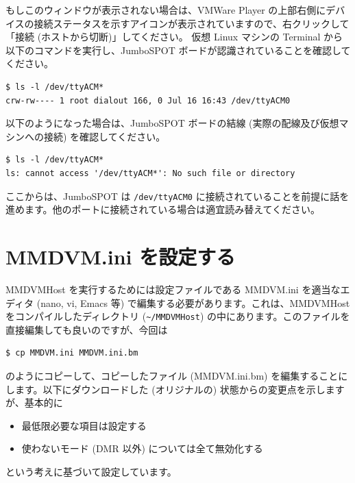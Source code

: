 \documentclass[a4j,oneside]{ujbook}
\begin{document}
もしこのウィンドウが表示されない場合は、VMWare Player の上部右側にデバイスの接続ステータスを示すアイコンが表示されていますので、右クリックして「接続 (ホストから切断)」してください。
仮想 Linux マシンの Terminal から以下のコマンドを実行し、JumboSPOT ボードが認識されていることを確認してください。

\begin{verbatim}
$ ls -l /dev/ttyACM*
crw-rw---- 1 root dialout 166, 0 Jul 16 16:43 /dev/ttyACM0
\end{verbatim}

以下のようになった場合は、JumboSPOT ボードの結線 (実際の配線及び仮想マシンへの接続) を確認してください。

\begin{verbatim}
$ ls -l /dev/ttyACM*
ls: cannot access '/dev/ttyACM*': No such file or directory
\end{verbatim}

ここからは、JumboSPOT は \verb+/dev/ttyACM0+ に接続されていることを前提に話を進めます。他のポートに接続されている場合は適宜読み替えてください。

\section{MMDVM.ini を設定する}

MMDVMHost を実行するためには設定ファイルである MMDVM.ini を適当なエディタ (nano, vi, Emacs 等) で編集する必要があります。これは、MMDVMHost をコンパイルしたディレクトリ (\verb+~/MMDVMHost+) の中にあります。このファイルを直接編集しても良いのですが、今回は

\begin{verbatim}
$ cp MMDVM.ini MMDVM.ini.bm
\end{verbatim}

のようにコピーして、コピーしたファイル (MMDVM.ini.bm) を編集することにします。以下にダウンロードした (オリジナルの) 状態からの変更点を示しますが、基本的に

\begin{itemize}
 \item 最低限必要な項目は設定する
 \item 使わないモード (DMR 以外) については全て無効化する
\end{itemize}

という考えに基づいて設定しています。
\end{document}
